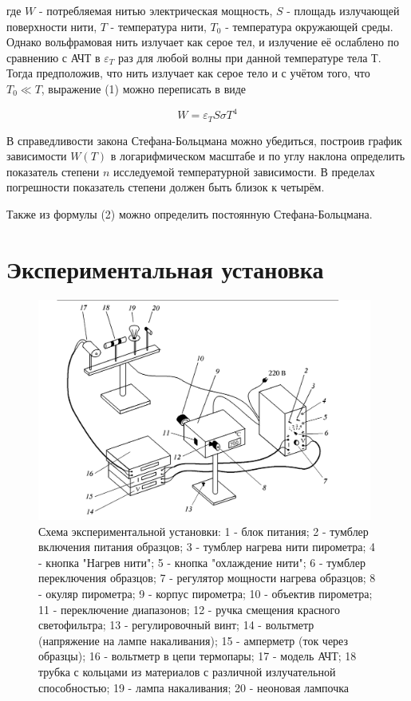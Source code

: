 \documentclass[15pt,a5paper,reqno]{article}
\begin{document}
где $W$ - потребляемая нитью электрическая мощность, $S$ - площадь излучающей поверхности нити, $T$ - температура нити, $T_0$ - температура окружающей среды. Однако вольфрамовая нить излучает как серое тел, и излучение её ослаблено по сравнению с АЧТ в $\varepsilon_T$ раз для любой волны при данной температуре тела Т. Тогда предположив, что нить излучает как серое тело и с учётом того, что $T_0 \ll T$, выражение (1) можно переписать в виде

\begin{equation}
    \label{SteffBolcmn}
    W = \varepsilon_T S \sigma T^4
\end{equation}

В справедливости закона Стефана-Больцмана можно убедиться, построив график зависимости $W(T)$ в логарифмическом масштабе и по углу наклона определить показатель степени $n$ исследуемой температурной зависимости. В пределах погрешности показатель степени должен быть близок к четырём. \par
Также из формулы (2) можно определить постоянную Стефана-Больцмана.

\section{Экспериментальная установка}

\begin{figure}[h]
    \centering
    \includegraphics[width=11cm]{pics/lab_5_8_1_scheme.png}
    \caption{Схема экспериментальной установки: 1 - блок питания; 2 - тумблер включения питания образцов; 3 - тумблер нагрева нити пирометра; 4 - кнопка "Нагрев нити"; 5 - кнопка "охлаждение нити"; 6 - тумблер переключения образцов; 7 - регулятор мощности нагрева образцов; 8 - окуляр пирометра; 9 - корпус пирометра; 10 - объектив пирометра; 11 - переключение диапазонов; 12 - ручка смещения красного светофильтра; 13 - регулировочный винт; 14 - вольтметр (напряжение на лампе накаливания); 15 - амперметр (ток через образцы); 16 - вольтметр в цепи термопары; 17 - модель АЧТ; 18 трубка с кольцами из материалов с различной излучательной способностью; 19 - лампа накаливания; 20 - неоновая лампочка}
    \label{scheme}
\end{figure}
\end{document}
